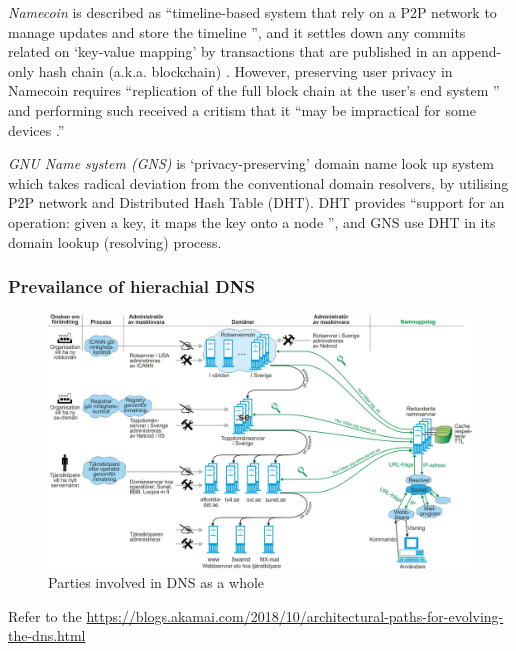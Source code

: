 \textit{Namecoin} is described as ``timeline-based system that rely on a P2P network to manage updates and store the timeline \cite{grothoff2017nsa}'', and it settles down any commits related on `key-value mapping' by transactions that are published in an append-only hash chain (a.k.a. blockchain) \cite{kalodner2015empirical}.
However, preserving user privacy in Namecoin requires ``replication of the full block chain at the user's end system \cite{grothoff2017nsa}'' and performing such received a critism that it ``may be impractical for some devices \cite{grothoff2017nsa}.''

\textit{GNU Name system (GNS)} is `privacy-preserving' domain name look up system which takes radical deviation from the conventional domain resolvers, by utilising P2P network and Distributed Hash Table (DHT).
DHT provides ``support for an operation: given a key, it maps the key onto a node \cite{stoica2001chord}'', and GNS use DHT in its domain lookup (resolving) process. 

\subsubsection{Prevailance of hierachial DNS}


\begin{figure}[h!]
    \begin{center}
    \includegraphics*[width=1\columnwidth]{img/DNS-maskinvara}
    \end{center}
    \caption{Parties involved in DNS as a whole}
    \label{dnsactors}
\end{figure}

Refer to the \url{https://blogs.akamai.com/2018/10/architectural-paths-for-evolving-the-dns.html}